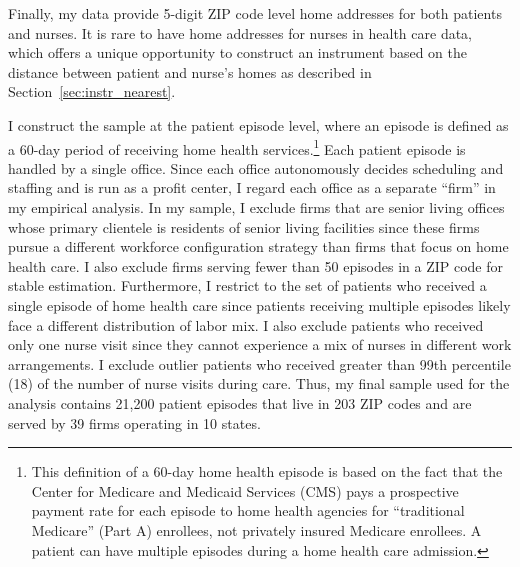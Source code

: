 \documentclass[final,12pt]{article}
\begin{document}
Finally, my data provide 5-digit ZIP code level home addresses for both patients and nurses. It is rare to have home addresses for nurses in health care data, which offers a unique opportunity to construct an instrument based on the distance between patient and nurse's homes as described in Section~\ref{sec:instr_nearest}.

I construct the sample at the patient episode level, where an episode is defined as a 60-day period of receiving home health services.\footnote{This definition of a 60-day home health episode is based on the fact that the Center for Medicare and Medicaid Services (CMS) pays a prospective payment rate for each episode to home health agencies for ``traditional Medicare'' (Part A) enrollees, not privately insured Medicare enrollees. A patient can have multiple episodes during a home health care admission.}
Each patient episode is handled by a single office.
Since each office autonomously decides scheduling and staffing and is run as a profit center, I regard each office as a separate ``firm'' in my empirical analysis.
In my sample, I exclude firms that are senior living offices whose primary clientele is residents of senior living facilities since these firms pursue a different workforce configuration strategy than firms that focus on home health care.
I also exclude firms serving fewer than 50 episodes in a ZIP code for stable estimation.
Furthermore, I restrict to the set of patients who received a single episode of home health care since patients receiving multiple episodes likely face a different distribution of labor mix. I also exclude patients who received only one nurse visit since they cannot experience a mix of nurses in different work arrangements.
I exclude outlier patients who received greater than 99th percentile (18) of the number of nurse visits during care.
Thus, my final sample used for the analysis contains 21,200 patient episodes that live in 203 ZIP codes and are served by 39 firms operating in 10 states.



\end{document}
